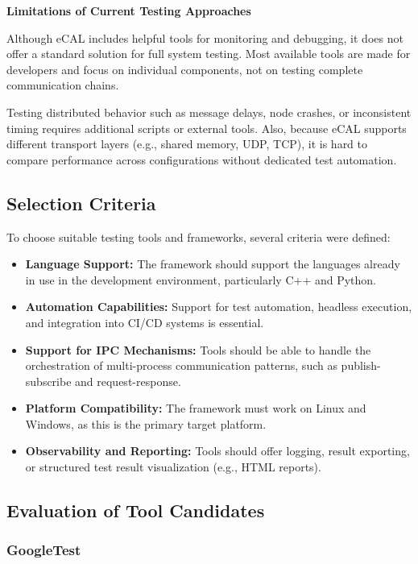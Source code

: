 \newpage
\textbf{Limitations of Current Testing Approaches}

\vspace{0.4em}
Although eCAL includes helpful tools for monitoring and debugging, it does not offer a standard solution for full system testing. Most available tools are made for developers and focus on individual components, not on testing complete communication chains.

\vspace{1em}
Testing distributed behavior such as message delays, node crashes, or inconsistent timing requires additional scripts or external tools. Also, because eCAL supports different transport layers (e.g., shared memory, UDP, TCP), it is hard to compare performance across configurations without dedicated test automation.

\subsection{Selection Criteria}

To choose suitable testing tools and frameworks, several criteria were defined:

\begin{itemize}
	\item \textbf{Language Support:} The framework should support the languages already in use in the development environment, particularly C++ and Python.
	\item \textbf{Automation Capabilities:} Support for test automation, headless execution, and integration into CI/CD systems is essential.
	\item \textbf{Support for IPC Mechanisms:} Tools should be able to handle the orchestration of multi-process communication patterns, such as publish-subscribe and request-response.
	\item \textbf{Platform Compatibility:} The framework must work on Linux and Windows, as this is the primary target platform.
	\item \textbf{Observability and Reporting:} Tools should offer logging, result exporting, or structured test result visualization (e.g., HTML reports).
\end{itemize}

\newpage
\subsection{Evaluation of Tool Candidates}

\subsubsection*{GoogleTest}

